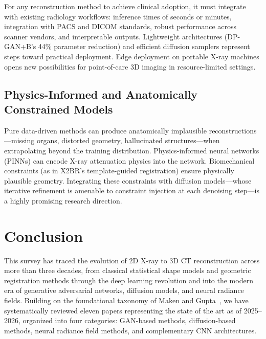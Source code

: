 \documentclass[10pt,twocolumn,a4paper]{article}
\begin{document}
For any reconstruction method to achieve clinical adoption, it must integrate
with existing radiology workflows: inference times of seconds or minutes,
integration with PACS and DICOM standards, robust performance across scanner
vendors, and interpretable outputs. Lightweight architectures (DP-GAN+B's 44\%
parameter reduction) and efficient diffusion samplers represent steps toward
practical deployment. Edge deployment on portable X-ray machines opens new
possibilities for point-of-care 3D imaging in resource-limited settings.

\subsection{Physics-Informed and Anatomically Constrained Models}
\label{sec:challenges:physics}

Pure data-driven methods can produce anatomically implausible
reconstructions---missing organs, distorted geometry, hallucinated
structures---when extrapolating beyond the training distribution. Physics-informed
neural networks (PINNs) can encode X-ray attenuation physics into the network.
Biomechanical constraints (as in X2BR's template-guided registration) ensure
physically plausible geometry. Integrating these constraints with diffusion
models---whose iterative refinement is amenable to constraint injection at each
denoising step---is a highly promising research direction.

\section{Conclusion}
\label{sec:conclusion}

This survey has traced the evolution of 2D X-ray to 3D CT reconstruction across
more than three decades, from classical statistical shape models and geometric
registration methods through the deep learning revolution and into the modern
era of generative adversarial networks, diffusion models, and neural radiance
fields. Building on the foundational taxonomy of Maken and Gupta~\cite{maken2023},
we have systematically reviewed eleven papers representing the state of the art
as of 2025--2026, organized into four categories: GAN-based methods, diffusion-based
methods, neural radiance field methods, and complementary CNN architectures.
\end{document}
